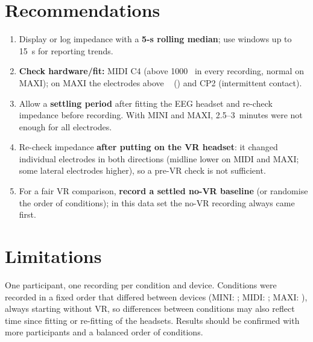 \documentclass[11pt,a4paper]{article}
\begin{document}
\section{Recommendations}
\begin{enumerate}
  \item Display or log impedance with a \textbf{5-s rolling median}; use
    windows up to 15~s for reporting trends.
  \item \textbf{Check hardware/fit:} MIDI C4 (above 1000~\impUnit{} in every
    recording, normal on MAXI); on MAXI the electrodes above \impHighZ~\impUnit{}
    (\impMAXIHighChNoVR) and CP2 (intermittent contact).
  \item Allow a \textbf{settling period} after fitting the EEG headset and
    re-check impedance before recording. With MINI and MAXI, 2.5--3~minutes
    were not enough for all electrodes.
  \item Re-check impedance \textbf{after putting on the VR headset}: it changed
    individual electrodes in both directions (midline lower on MIDI and MAXI;
    some lateral electrodes higher), so a pre-VR check is not sufficient.
  \item For a fair VR comparison, \textbf{record a settled no-VR baseline} (or
    randomise the order of conditions); in this data set the no-VR recording
    always came first.
\end{enumerate}

\section{Limitations}
One participant, one recording per condition and device. Conditions were
recorded in a fixed order that differed between devices (MINI: \impMINIOrder;
MIDI: \impMIDIOrder; MAXI: \impMAXIOrder), always starting without VR, so
differences between conditions may also reflect time since fitting or
re-fitting of the headsets. Results should be confirmed with more participants
and a balanced order of conditions.

\clearpage
\appendix
\end{document}
